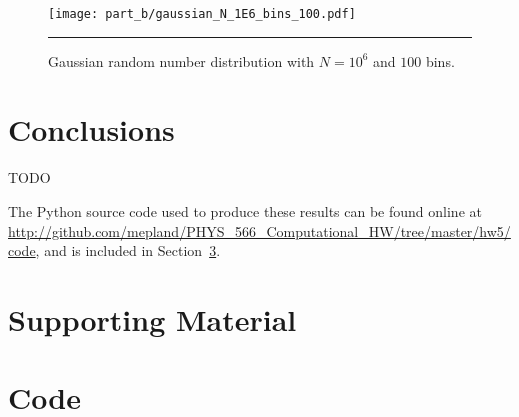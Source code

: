 \documentclass[notitlepage,aps,prd,nofootinbib]{revtex4-1}
\begin{document}
\begin{figure}[!htbc]
  \centering
  \texttt{[image: part\_b/gaussian\_N\_1E6\_bins\_100.pdf]}
	{\par\nobreak\rule[9pt]{35em}{0.5pt}\vspace{-5mm}}
	\caption{Gaussian random number distribution with $N = 10^6$ and $100$ bins.}
	\label{fig:gaussian_N_1E6_bins_100}
\end{figure}



\clearpage
\section{Conclusions}
\label{sec:Conclusions}
TODO

The Python source code used to produce these results can be found online at \url{http://github.com/mepland/PHYS_566_Computational_HW/tree/master/hw5/code}, and is included in Section~\ref{sec:code}.


\section{Supporting Material}
\label{sec:Supporting_Material}




\clearpage


\clearpage
\section{Code}
\label{sec:code}


\end{document}
